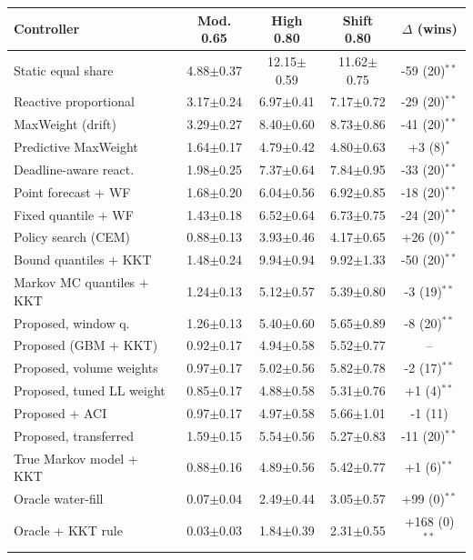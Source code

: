 \begin{tabular}{lcccc}
\hline
Controller & Mod. 0.65 & High 0.80 & Shift 0.80 & $\Delta$ (wins) \\
\hline
Static equal share & 4.88$\pm$0.37 & 12.15$\pm$0.59 & 11.62$\pm$0.75 & -59 (20)$^{\ast\ast}$ \\
Reactive proportional & 3.17$\pm$0.24 & 6.97$\pm$0.41 & 7.17$\pm$0.72 & -29 (20)$^{\ast\ast}$ \\
MaxWeight (drift) & 3.29$\pm$0.27 & 8.40$\pm$0.60 & 8.73$\pm$0.86 & -41 (20)$^{\ast\ast}$ \\
Predictive MaxWeight & 1.64$\pm$0.17 & 4.79$\pm$0.42 & 4.80$\pm$0.63 & +3 (8)$^{\ast}$ \\
Deadline-aware react. & 1.98$\pm$0.25 & 7.37$\pm$0.64 & 7.84$\pm$0.95 & -33 (20)$^{\ast\ast}$ \\
Point forecast + WF & 1.68$\pm$0.20 & 6.04$\pm$0.56 & 6.92$\pm$0.85 & -18 (20)$^{\ast\ast}$ \\
Fixed quantile + WF & 1.43$\pm$0.18 & 6.52$\pm$0.64 & 6.73$\pm$0.75 & -24 (20)$^{\ast\ast}$ \\
Policy search (CEM) & 0.88$\pm$0.13 & 3.93$\pm$0.46 & 4.17$\pm$0.65 & +26 (0)$^{\ast\ast}$ \\
Bound quantiles + KKT & 1.48$\pm$0.24 & 9.94$\pm$0.94 & 9.92$\pm$1.33 & -50 (20)$^{\ast\ast}$ \\
Markov MC quantiles + KKT & 1.24$\pm$0.13 & 5.12$\pm$0.57 & 5.39$\pm$0.80 & -3 (19)$^{\ast\ast}$ \\
Proposed, window q. & 1.26$\pm$0.13 & 5.40$\pm$0.60 & 5.65$\pm$0.89 & -8 (20)$^{\ast\ast}$ \\
Proposed (GBM + KKT) & 0.92$\pm$0.17 & 4.94$\pm$0.58 & 5.52$\pm$0.77 & -- \\
Proposed, volume weights & 0.97$\pm$0.17 & 5.02$\pm$0.56 & 5.82$\pm$0.78 & -2 (17)$^{\ast\ast}$ \\
Proposed, tuned LL weight & 0.85$\pm$0.17 & 4.88$\pm$0.58 & 5.31$\pm$0.76 & +1 (4)$^{\ast\ast}$ \\
Proposed + ACI & 0.97$\pm$0.17 & 4.97$\pm$0.58 & 5.66$\pm$1.01 & -1 (11) \\
Proposed, transferred & 1.59$\pm$0.15 & 5.54$\pm$0.56 & 5.27$\pm$0.83 & -11 (20)$^{\ast\ast}$ \\
True Markov model + KKT & 0.88$\pm$0.16 & 4.89$\pm$0.56 & 5.42$\pm$0.77 & +1 (6)$^{\ast\ast}$ \\
Oracle water-fill & 0.07$\pm$0.04 & 2.49$\pm$0.44 & 3.05$\pm$0.57 & +99 (0)$^{\ast\ast}$ \\
Oracle + KKT rule & 0.03$\pm$0.03 & 1.84$\pm$0.39 & 2.31$\pm$0.55 & +168 (0)$^{\ast\ast}$ \\
\hline
\end{tabular}

